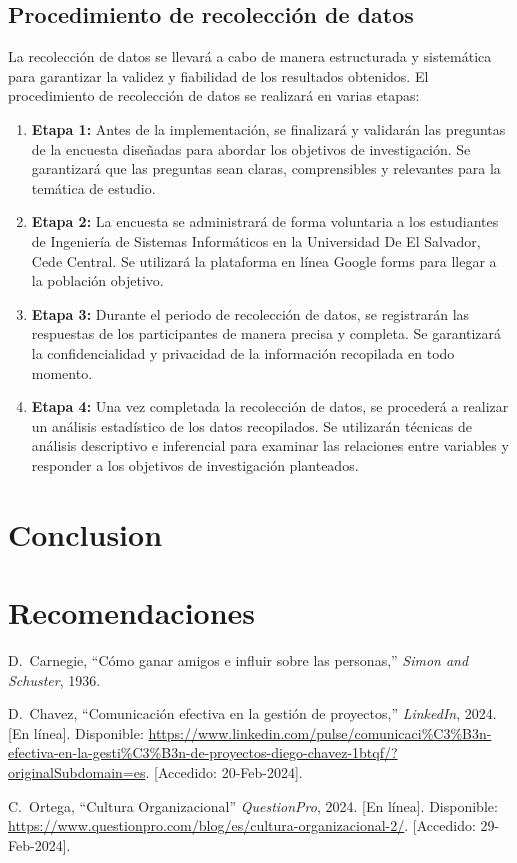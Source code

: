 \documentclass[journal]{IEEEtran}
\begin{document}
\subsection{Procedimiento de recolección de datos}
La recolección de datos se llevará a cabo de manera estructurada y sistemática para garantizar la validez y fiabilidad de los resultados obtenidos. El procedimiento de recolección de datos se realizará en varias etapas:

\begin{enumerate}
	\item \textbf{Etapa 1:} Antes de la implementación, se finalizará y validarán las preguntas de la encuesta diseñadas para abordar los objetivos de investigación. Se garantizará que las preguntas sean claras, comprensibles y relevantes para la temática de estudio.
	\item \textbf{Etapa 2:} La encuesta se administrará de forma voluntaria a los estudiantes de Ingeniería de Sistemas Informáticos en la Universidad De El Salvador, Cede Central. Se utilizará la plataforma en línea Google forms para llegar a la población objetivo.
	\item \textbf{Etapa 3:} Durante el periodo de recolección de datos, se registrarán las respuestas de los participantes de manera precisa y completa. Se garantizará la confidencialidad y privacidad de la información recopilada en todo momento.
	\item \textbf{Etapa 4:} Una vez completada la recolección de datos, se procederá a realizar un análisis estadístico de los datos recopilados. Se utilizarán técnicas de análisis descriptivo e inferencial para examinar las relaciones entre variables y responder a los objetivos de investigación planteados. 
\end{enumerate}

\section{Conclusion}

\section{Recomendaciones}

\begin{thebibliography}{1}
  
D.~Carnegie, ``Cómo ganar amigos e influir sobre las personas,'' \emph{Simon and Schuster}, 1936.
  
D.~Chavez, ``Comunicación efectiva en la gestión de proyectos,'' \emph{LinkedIn}, 2024. [En línea]. Disponible: \url{https://www.linkedin.com/pulse/comunicaci%C3%B3n-efectiva-en-la-gesti%C3%B3n-de-proyectos-diego-chavez-1btqf/?originalSubdomain=es}. [Accedido: 20-Feb-2024].

C.~Ortega,  ``Cultura Organizacional'' \emph{QuestionPro}, 2024. [En línea]. Disponible: \url{https://www.questionpro.com/blog/es/cultura-organizacional-2/}. [Accedido: 29-Feb-2024].

\end{thebibliography}
\end{document}
